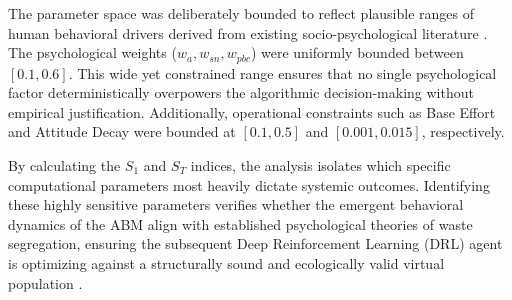 The parameter space was deliberately bounded to reflect plausible ranges of human behavioral drivers derived from existing socio-psychological literature \citep{Meng2018}. The psychological weights ($w_a, w_{sn}, w_{pbc}$) were uniformly bounded between $[0.1, 0.6]$. This wide yet constrained range ensures that no single psychological factor deterministically overpowers the algorithmic decision-making without empirical justification. Additionally, operational constraints such as Base Effort and Attitude Decay were bounded at $[0.1, 0.5]$ and $[0.001, 0.015]$, respectively. 

By calculating the $S_1$ and $S_T$ indices, the analysis isolates which specific computational parameters most heavily dictate systemic outcomes. Identifying these highly sensitive parameters verifies whether the emergent behavioral dynamics of the ABM align with established psychological theories of waste segregation, ensuring the subsequent Deep Reinforcement Learning (DRL) agent is optimizing against a structurally sound and ecologically valid virtual population \citep{TianReview2024}.